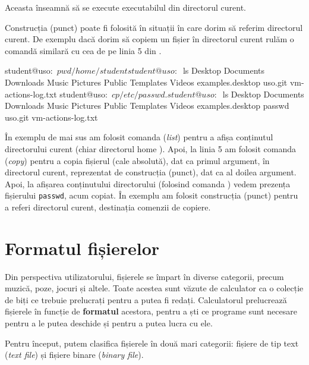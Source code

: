 
Aceasta înseamnă să se execute executabilul  din directorul curent.

Construcția  (punct) poate fi folosită în situații în care dorim să referim directorul curent.
De exemplu dacă dorim să copiem un fișier în directorul curent rulăm o comandă similară cu cea de pe linia 5 din .

\begin{screen}[caption={Referința . către directorul curent},label={lst:fs:dot}]
student@uso:~$ pwd
/home/student
student@uso:~$ ls
Desktop  Documents  Downloads  Music  Pictures  Public  Templates  Videos  examples.desktop  uso.git  vm-actions-log.txt
student@uso:~$ cp /etc/passwd .
student@uso:~$ ls
Desktop  Documents  Downloads  Music  Pictures  Public  Templates  Videos  examples.desktop  passwd  uso.git  vm-actions-log.txt
\end{screen}

În exemplu de mai sus am folosit comanda  (\textit{list}) pentru a afișa conținutul directorului curent (chiar directorul home ).
Apoi, la linia 5 am folosit comanda  (\textit{copy}) pentru a copia fișierul  (cale absolută), dat ca primul argument, în directorul curent, reprezentat de construcția  (punct), dat ca al doilea argument.
Apoi, la afișarea conținutului directorului (folosind comanda ) vedem prezența fișierului \texttt{passwd}, acum copiat.
În exemplu am folosit construcția  (punct) pentru a referi directorul curent, destinația comenzii de copiere.

\section{Formatul fișierelor}
\label{sec:fs:file-format}

Din perspectiva utilizatorului, fișierele se împart în diverse categorii, precum muzică, poze, jocuri și altele.
Toate acestea sunt văzute de calculator ca o colecție de biți ce trebuie prelucrați pentru a putea fi redați.
Calculatorul prelucrează fișierele în funcție de \textbf{formatul} acestora, pentru a ști ce programe sunt necesare pentru a le putea deschide și pentru a putea lucra cu ele.

Pentru început, putem clasifica fișierele în două mari categorii: fișiere de tip text (\textit{text file}) și fișiere binare (\textit{binary file}).

